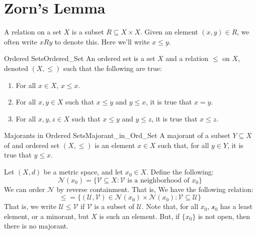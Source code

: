 \section{Zorn's Lemma}
    A relation on a set $X$ is a subset $R\subseteq{X}\times{X}$. Given an
    element $(x,y)\in{R}$, we often write $xRy$ to denote this. Here we'll write
    $x\leq{y}$.
    \begin{ldefinition}{Ordered Sets}{Ordered_Set}
        An ordered set is a set $X$ and a relation $\leq$ on $X$, denoted
        $(X,\leq)$ such that the following are true:
        \begin{enumerate}
            \item   For all $x\in{X}$, $x\leq{x}$.
            \item   For all $x,y\in{X}$ such that $x\leq{y}$ and $y\leq{x}$, it
                    is true that $x=y$.
            \item   For all $x,y,z\in{X}$ such that $x\leq{y}$ and $y\leq{z}$,
                    it is true that $x\leq{z}$.
        \end{enumerate}
    \end{ldefinition}
    \begin{ldefinition}{Majorants in Ordered Sets}{Majorant_in_Ord_Set}
        A majorant of a subset $Y\subseteq{X}$ of and ordered set $(X,\leq)$ is
        an element $x\in{X}$ such that, for all $y\in{Y}$, it is true that
        $y\leq{x}$.
    \end{ldefinition}
    \begin{lexample}{}{}
        Let $(X,d)$ be a metric space, and let $x_{0}\in{X}$. Define the
        following:
        \begin{equation}
            \mathscr{N}(x_{0})=
            \big\{\mathcal{V}\subseteq{X}:\mathcal{V}
                \textrm{ is a neighborhood of $x_{0}$}\big\}
        \end{equation}
        We can order $\mathscr{N}$ by reverse containment. That is, We have the
        following relation:
        \begin{equation}
            \leq=\big\{(\mathcal{U},\mathcal{V})\in
                \mathscr{N}(x_{0})\times\mathscr{N}(x_{0})
                :\mathcal{V}\subseteq\mathcal{U}\big\}
        \end{equation}
        That is, we write $\mathcal{U}\leq\mathcal{V}$ if $\mathcal{V}$ is a
        subset of $\mathcal{U}$. Note that, for all $x_{0}$, $\mathscr{x_{0}}$
        has a least element, or a minorant, but $X$ is such an element. But, if
        $\{x_{0}\}$ is not open, then there is no majorant.
    \end{lexample}
